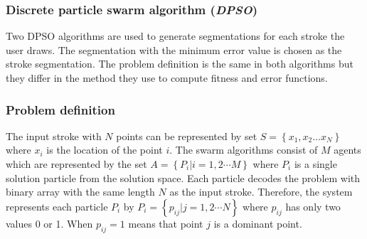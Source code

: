 \documentclass[a4paper,10pt]{IEEEconf}
\begin{document}
\subsubsection{Discrete particle swarm algorithm (\textit{DPSO})}
\label{subsubsec:Discreteparticleswarmalgorithm}
Two DPSO algorithms are used to generate segmentations for each stroke the user draws. The segmentation with the minimum error value is chosen as the stroke segmentation. The problem definition is the same in both algorithms but they differ in the method they use to compute fitness and error functions.  
\subsubsection{Problem definition}
The input stroke with $N$ points can be represented by set $S = \left\{ {x_1 ,x_2  \ldots x_N } \right\}$ where $x_i$ is the location of the point $i$. The swarm algorithms consist of $M$ agents which are represented by the set 
$A  = \left\{ {P_i \left| {i = 1,2 \cdots M} \right.} \right\}$ where $P_i$ is a single solution particle from the solution space. Each particle decodes the problem with binary array with the same length $N$ as the input stroke.  
Therefore, the system represents each particle $P_i$ by $P_i = \left\{ {p_{ij} \left| {j = 1,2 \cdots N} \right.} \right\}$ where $p_{ij}$ has only two values 0 or 1. When $p_{ij}=1$ means that point $j$ is a dominant point. 
\end{document}
